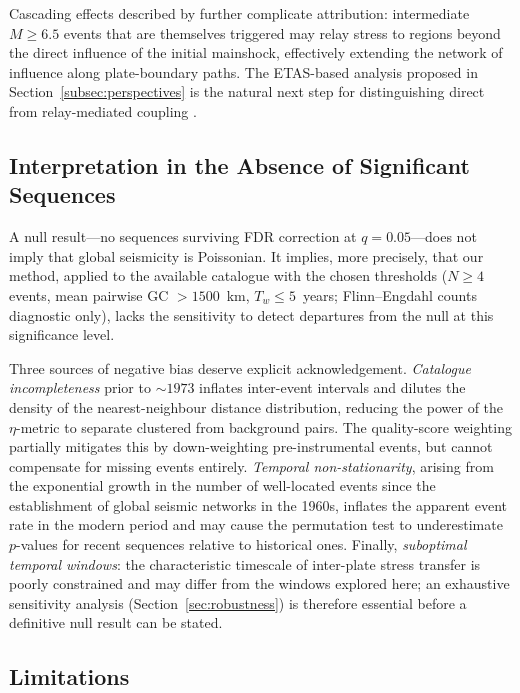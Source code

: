 \documentclass[draft]{agujournal2019}
\begin{document}
Cascading effects described by \citet{MarsanLengliene2008} further
complicate attribution: intermediate $M\geq 6.5$ events that are
themselves triggered may relay stress to regions beyond the direct
influence of the initial mainshock, effectively extending the network of
influence along plate-boundary paths.  The ETAS-based analysis proposed
in Section~\ref{subsec:perspectives} is the natural next step for
distinguishing direct from relay-mediated coupling
\citep{HelmstettterSornette2003, Ogata1998}.

\subsection{Interpretation in the Absence of Significant Sequences}
\label{subsec:sequences_absent}

A null result---no sequences surviving FDR correction at $q = 0.05$---does
not imply that global seismicity is Poissonian.  It implies, more
precisely, that our method, applied to the available catalogue with the
chosen thresholds ($N \geq 4$ events, mean pairwise GC $> 1500$~km,
$T_w \leq 5$~years; Flinn--Engdahl counts diagnostic only), lacks the sensitivity to detect departures from the null at
this significance level.

Three sources of negative bias deserve explicit acknowledgement.
\emph{Catalogue incompleteness} prior to $\sim\!1973$ inflates
inter-event intervals and dilutes the density of the nearest-neighbour
distance distribution, reducing the power of the $\eta$-metric to
separate clustered from background pairs.  The quality-score
weighting partially mitigates this by down-weighting pre-instrumental
events, but cannot compensate for missing events entirely.
\emph{Temporal non-stationarity}, arising from the exponential growth in
the number of well-located events since the establishment of global
seismic networks in the 1960s, inflates the apparent event rate in the
modern period and may cause the permutation test to underestimate
$p$-values for recent sequences relative to historical ones.  Finally,
\emph{suboptimal temporal windows}: the characteristic timescale of
inter-plate stress transfer is poorly constrained and may differ from the
windows explored here; an exhaustive sensitivity analysis
(Section~\ref{sec:robustness}) is therefore essential before a definitive
null result can be stated.

\subsection{Limitations}
\label{sec:limitations}
\end{document}
